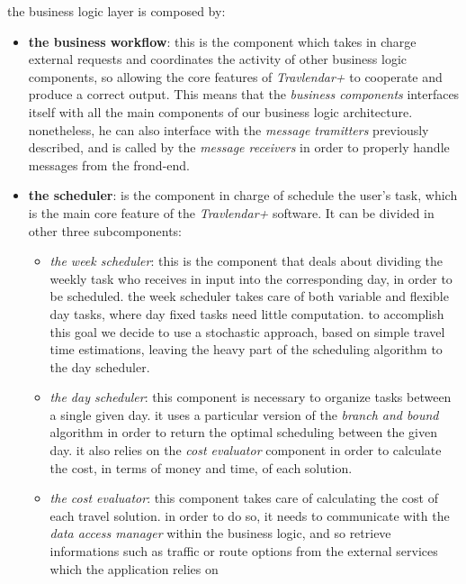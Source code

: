 the business logic layer is composed by:
\begin{itemize}
    \item \textbf{the business workflow}: this is the component which takes in charge external requests and coordinates the activity of other business logic components, so allowing the core features of \emph{Travlendar+} to cooperate and produce a correct output. This means that the \emph{business components} interfaces itself with all the main components of our business logic architecture. nonetheless, he can also interface with the \emph{message tramitters} previously described, and is called by the \emph{message receivers} in order to properly handle messages from the frond-end.
    
    \item \textbf{the scheduler}: is the component in charge of schedule the user's task, which is the main core feature of the \emph{Travlendar+} software. It can be divided in other three subcomponents:
            \begin{itemize}
            
                \item \textit{the week scheduler}: this is the component that deals about dividing the weekly task who receives in input into the corresponding day, in order to be scheduled. the week scheduler takes care of both variable and flexible day tasks, where day fixed tasks need little computation.  to accomplish this goal we decide to use a stochastic approach, based on simple travel time estimations, leaving the heavy part of the scheduling algorithm to the day scheduler.
                
                \item \textit{the day scheduler}: this component is necessary to organize tasks between a single given day. it uses a particular version of the \emph{branch and bound} algorithm in order to return the optimal scheduling between the given day. it also relies on the \emph{cost evaluator} component in order to calculate the cost, in terms of money and time, of each solution.
                
                \item \textit{the cost evaluator}: this component takes care of calculating the cost of each travel solution. in order to do so, it needs to communicate with the \emph{data access manager} within the business logic, and so retrieve informations such as traffic or route options from the external services which the application relies on 
                

\end{itemize}
\end{itemize}
